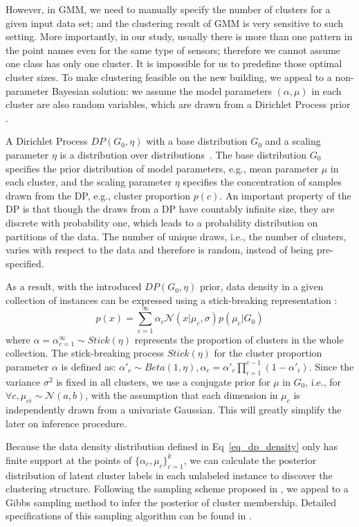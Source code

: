 However, in GMM, we need to manually specify the number of clusters for a given input data set; and the clustering result of GMM is very sensitive to such setting. More importantly, in our study, usually there is more than one pattern in the point names even for the same type of sensors; therefore we cannot assume one class has only one cluster. It is impossible for us to predefine those optimal cluster sizes. To make clustering feasible on the new building, we appeal to a non-parameter Bayesian solution: we assume the model parameters $(\alpha, \mu)$ in each cluster are also random variables, which are drawn from a Dirichlet Process prior \cite{dp}.

A Dirichlet Process $DP(G_0, \eta)$ with a base distribution $G_0$ and a scaling parameter $\eta$ is a distribution over distributions~\cite{dp}. The base distribution $G_0$ specifies the prior distribution of model parameters, e.g., mean parameter $\mu$ in each cluster, and the scaling parameter $\eta$ specifies the concentration of samples drawn from the DP, e.g., cluster proportion $p(c)$. An important property of the DP is that though the draws from a DP have countably infinite size, they are discrete with probability one, which leads to a probability distribution on partitions of the data. The number of unique draws, i.e., the number of clusters, varies with respect to the data and therefore is random, instead of being pre-specified.

As a result, with the introduced $DP(G_{0}, \eta)$ prior, data density in a given collection of instances can be expressed using a stick-breaking representation
\cite{sethuraman1994constructive}:
\begin{equation}\label{eq_dp_density}
p(x)=\sum_{c=1}^\infty \alpha_c \mathcal{N}(x|\mu_c,\sigma)p(\mu_c|G_0)
\end{equation}
where $\alpha={\alpha}_{c=1}^\infty\sim Stick(\eta)$ represents the proportion of clusters in the whole collection. The stick-breaking process $Stick(\eta)$ for the cluster proportion parameter $\alpha$ is defined as: $\alpha'_c\sim Beta(1, \eta), \alpha_c=\alpha'_c\prod_{i=1}^{c-1}(1-\alpha'_i)$. Since the variance $\sigma^2$ is fixed in all clusters, we use a conjugate prior for $\mu$ in $G_0$, i.e., for $\forall c, \mu_{ci}\sim \mathcal{N}(a,b)$, with the assumption that each dimension in $\mu_c$ is independently drawn from a univariate Gaussian. This will greatly simplify the later on inference procedure.

Because the data density distribution defined in Eq~\eqref{eq_dp_density} only has finite support at the points of $\{\alpha_c, \mu_c\}^k_{c=1}$, we can calculate the posterior distribution of latent cluster labels in each unlabeled instance to discover the clustering structure. Following the sampling scheme proposed in \cite{neal2000markov}, we appeal to a Gibbs sampling method to infer the posterior of cluster membership. Detailed specifications of this sampling algorithm can be found in \cite{neal2000markov}.


